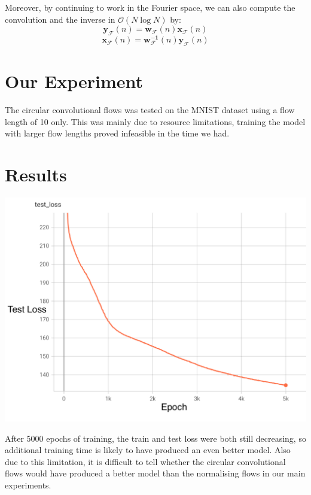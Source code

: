 Moreover, by continuing to work in the Fourier space, we can also compute the convolution and the inverse in $\mathcal{O}(N \log N)$ by:
\begin{equation}
	\mathbf{y_\mathcal{F}}(n) = \mathbf{w_\mathcal{F}}(n)\mathbf{x_\mathcal{F}}(n)
\end{equation}
\begin{equation}
	\mathbf{x_\mathcal{F}}(n) = \mathbf{w_\mathcal{F}^{-1}}(n)\mathbf{y_\mathcal{F}}(n)
\end{equation}

\section{Our Experiment}

The circular convolutional flows was tested on the MNIST dataset using a flow length of 10 only. This was mainly due to resource limitations, training the model with larger flow lengths proved infeasible in the time we had.

\section{Results}

\includegraphics[scale=0.5]{circular_conv_test_loss.png}

After 5000 epochs of training, the train and test loss were both still decreasing, so additional training time is likely to have produced an even better model.
Also due to this limitation, it is difficult to tell whether the circular convolutional flows would have produced a better model than the normalising flows in our main experiments. 
